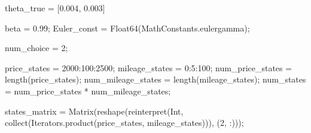 \documentclass[
  letterpaper,
  DIV=11,
  numbers=noendperiod]{scrreprt}
\newenvironment{Shaded}{\begin{snugshade}}{\end{snugshade}}
\newcommand{\BuiltInTok}[1]{\textcolor[rgb]{0.00,0.23,0.31}{#1}}
\newcommand{\CharTok}[1]{\textcolor[rgb]{0.13,0.47,0.30}{#1}}
\newcommand{\ConstantTok}[1]{\textcolor[rgb]{0.56,0.35,0.01}{#1}}
\newcommand{\DataTypeTok}[1]{\textcolor[rgb]{0.68,0.00,0.00}{#1}}
\newcommand{\FloatTok}[1]{\textcolor[rgb]{0.68,0.00,0.00}{#1}}
\newcommand{\FunctionTok}[1]{\textcolor[rgb]{0.28,0.35,0.67}{#1}}
\newcommand{\NormalTok}[1]{\textcolor[rgb]{0.00,0.23,0.31}{#1}}
\newcommand{\OperatorTok}[1]{\textcolor[rgb]{0.37,0.37,0.37}{#1}}
\begin{document}
\begin{Shaded}
\begin{Highlighting}[]
\NormalTok{theta\_true }\OperatorTok{=}\NormalTok{ [}\FloatTok{0.004}\NormalTok{, }\FloatTok{0.003}\NormalTok{]}

\NormalTok{beta }\OperatorTok{=} \FloatTok{0.99}\NormalTok{;}
\NormalTok{Euler\_const }\OperatorTok{=} \FunctionTok{Float64}\NormalTok{(}\BuiltInTok{MathConstants}\NormalTok{.}\ConstantTok{eulergamma}\NormalTok{);}

\NormalTok{num\_choice }\OperatorTok{=} \FloatTok{2}\NormalTok{;}
\end{Highlighting}
\end{Shaded}

\begin{Shaded}
\begin{Highlighting}[]
\NormalTok{price\_states }\OperatorTok{=} \FloatTok{2000}\OperatorTok{:}\FloatTok{100}\OperatorTok{:}\FloatTok{2500}\NormalTok{;}
\NormalTok{mileage\_states }\OperatorTok{=} \FloatTok{0}\OperatorTok{:}\FloatTok{5}\OperatorTok{:}\FloatTok{100}\NormalTok{;}
\NormalTok{num\_price\_states }\OperatorTok{=} \FunctionTok{length}\NormalTok{(price\_states);}
\NormalTok{num\_mileage\_states }\OperatorTok{=} \FunctionTok{length}\NormalTok{(mileage\_states);}
\NormalTok{num\_states }\OperatorTok{=}\NormalTok{ num\_price\_states }\OperatorTok{*}\NormalTok{ num\_mileage\_states;}

\NormalTok{states\_matrix }\OperatorTok{=} \FunctionTok{Matrix}\NormalTok{(}\FunctionTok{reshape}\NormalTok{(}\FunctionTok{reinterpret}\NormalTok{(}\DataTypeTok{Int}\NormalTok{, }\FunctionTok{collect}\NormalTok{(}\BuiltInTok{Iterators}\NormalTok{.}\FunctionTok{product}\NormalTok{(price\_states, mileage\_states))), (}\FloatTok{2}\NormalTok{, }\OperatorTok{:}\NormalTok{))}\CharTok{\textquotesingle{});}
\end{Highlighting}
\end{Shaded}
\end{document}
